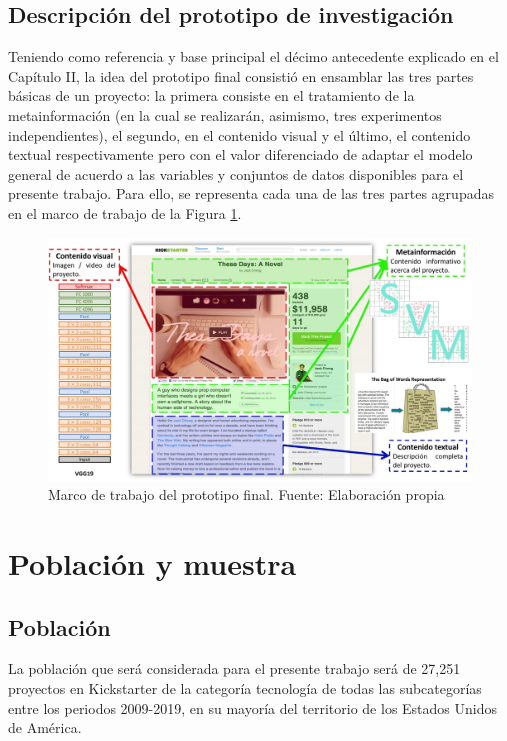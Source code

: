 \subsection{Descripción del prototipo de investigación}
Teniendo como referencia y base principal el décimo antecedente explicado en el Capítulo II, la idea del prototipo final consistió en ensamblar las tres partes básicas de un proyecto: la primera consiste en el tratamiento de la metainformación (en la cual se realizarán, asimismo, tres experimentos independientes), el segundo, en el contenido visual y el último, el contenido textual respectivamente pero con el valor diferenciado de adaptar el modelo general de acuerdo a las variables y conjuntos de datos disponibles para el presente trabajo. Para ello, se representa cada una de las tres partes agrupadas en el marco de trabajo de la Figura \ref{3:fig1}.
\begin{figure}[htbp]
	\begin{center}
		\includegraphics[width=1\textwidth]{3/figures/prototipo.jpg}
		\caption{Marco de trabajo del prototipo final. Fuente: Elaboración propia}
		\label{3:fig1}
	\end{center}
\end{figure}

\section{Población y muestra}

\subsection{Población}
La población que será considerada para el presente trabajo será de 27,251 proyectos en Kickstarter de la categoría tecnología de todas las subcategorías entre los periodos 2009-2019, en su mayoría del territorio de los Estados Unidos de América.


